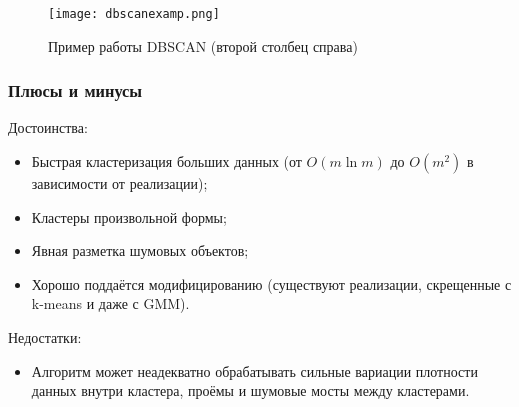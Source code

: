 \documentclass[12pt,pdf,notheorems]{beamer}
\begin{document}
\begin{frame}
	\begin{figure}
	\centering
		\texttt{[image: dbscanexamp.png]}
		\caption{Пример работы DBSCAN (второй столбец справа)}
	\end{figure}
\end{frame}


\begin{frame}\frametitle{Плюсы и минусы}
	Достоинства:
	\begin{itemize}
		\item Быстрая кластеризация больших данных (от $O(m \ln m)$ до $O(m^2)$ в зависимости от реализации);
		\item Кластеры произвольной формы;
		\item Явная разметка шумовых объектов;
		\item Хорошо поддаётся модифицированию (существуют реализации, скрещенные с k-means и даже с GMM).
	\end{itemize}
	Недостатки:
	\begin{itemize}
	\item Алгоритм может неадекватно обрабатывать сильные вариации плотности данных внутри кластера, проёмы и шумовые мосты между кластерами.
	\end{itemize}
\end{frame}
\end{document}
